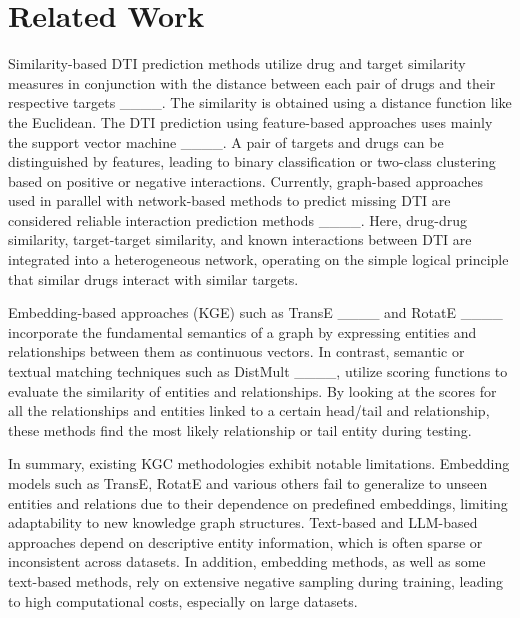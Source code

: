 \section{Related Work}
Similarity-based DTI prediction methods utilize drug and target similarity measures in conjunction with the distance between each pair of drugs and their respective targets ____. The similarity is obtained using a distance function like the Euclidean.
The DTI prediction using feature-based approaches uses mainly the support vector machine ____. A pair of targets and drugs can be distinguished by features, leading to binary classification or two-class clustering based on positive or negative interactions.
Currently, graph-based approaches used in parallel with network-based methods to predict missing DTI are considered reliable interaction prediction methods ____. Here, drug-drug similarity, target-target similarity, and known interactions between DTI are integrated into a heterogeneous network, operating on the simple logical principle that similar drugs interact with similar targets.


Embedding-based approaches (KGE) such as TransE ____ and RotatE ____ incorporate the fundamental semantics of a graph by expressing entities and relationships between them as continuous vectors. In contrast, semantic or textual matching techniques such as DistMult ____, utilize scoring functions to evaluate the similarity of entities and relationships. By looking at the scores for all the relationships and entities linked to a certain head/tail and relationship, these methods find the most likely relationship or tail entity during testing. 

In summary, existing KGC methodologies exhibit notable limitations. Embedding models such as TransE, RotatE and various others fail to generalize to unseen entities and relations due to their dependence on predefined embeddings, limiting adaptability to new knowledge graph structures. Text-based and LLM-based approaches depend on descriptive entity information, which is often sparse or inconsistent across datasets. In addition, embedding methods, as well as some text-based methods, rely on extensive negative sampling during training, leading to high computational costs, especially on large datasets. 
%